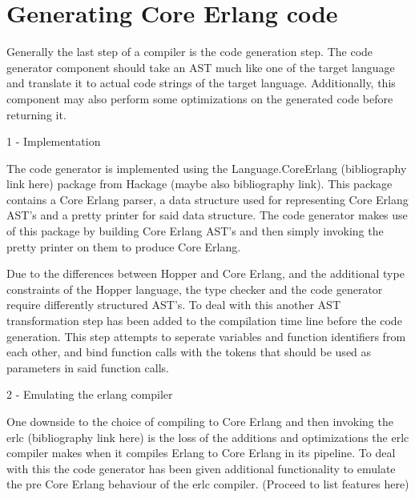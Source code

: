\section{Generating Core Erlang code}

Generally the last step of a compiler is the code generation step. The code generator
component should take an AST much like one of the target language and translate it
to actual code strings of the target language. Additionally, this component may also
perform some optimizations on the generated code before returning it.

1 - Implementation

The code generator is implemented using the Language.CoreErlang (bibliography link here)
package from Hackage (maybe also bibliography link). This package contains a Core Erlang
parser, a data structure used for representing Core Erlang AST's and a pretty printer for
said data structure. The code generator makes use of this package by building Core Erlang
AST's and then simply invoking the pretty printer on them to  produce Core Erlang.

Due to the differences between Hopper and Core Erlang, and the additional type constraints
of the Hopper language, the type checker and the code generator require differently
structured AST's. To deal with this another AST transformation step has been added to the
compilation time line before the code generation. This step attempts to seperate variables
and function identifiers from each other, and bind function calls with the tokens that
should be used as parameters in said function calls.

2 - Emulating the erlang compiler

One downside to the choice of compiling to Core Erlang and then invoking the erlc
(bibliography link here) is the loss of the additions and optimizations the erlc
compiler makes when it compiles Erlang to Core Erlang in its pipeline. To deal with this
the code generator has been given additional functionality to emulate the pre Core Erlang
behaviour of the erlc compiler. (Proceed to list features here)
